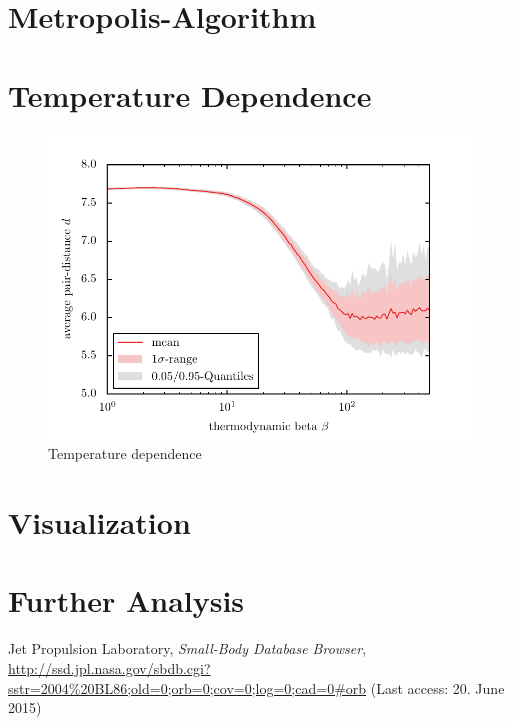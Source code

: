 \documentclass[11pt, a4paper]{article}
\numberwithin{equation}{section}
\begin{document}
\section{Metropolis-Algorithm} \label{Sec:Metropolis}
\section{Temperature Dependence} \label{Sec:Temperature}

\begin{figure}
	\centering
	\includegraphics{./figures/temp_dep_coulomb2d.pdf}
	\caption{Temperature dependence}
\end{figure}


\section{Visualization} \label{Sec:Visualisation}
\section{Further Analysis} \label{Sec:Further_Analysis}

\FloatBarrier
\vspace{\fill}
\begin{thebibliography}{9}
	Jet Propulsion Laboratory,
	\emph{Small-Body Database Browser},\\
	\url{http://ssd.jpl.nasa.gov/sbdb.cgi?sstr=2004%20BL86;old=0;orb=0;cov=0;log=0;cad=0#orb} (Last access: 20. June 2015)
\end{thebibliography}
\end{document}
